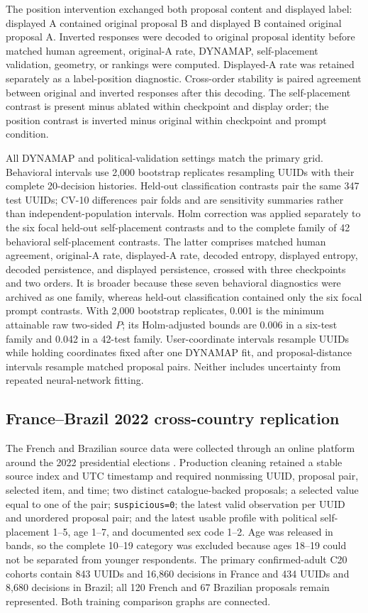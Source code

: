 \documentclass[unnumsec,webpdf,modern,large]{oup-authoring-template}
\begin{document}
The position intervention exchanged both proposal content and displayed label: displayed A contained original proposal B and displayed B contained original proposal A. Inverted responses were decoded to original proposal identity before matched human agreement, original-A rate, DYNAMAP, self-placement validation, geometry, or rankings were computed. Displayed-A rate was retained separately as a label-position diagnostic. Cross-order stability is paired agreement between original and inverted responses after this decoding. The self-placement contrast is present minus ablated within checkpoint and display order; the position contrast is inverted minus original within checkpoint and prompt condition.

All DYNAMAP and political-validation settings match the primary grid. Behavioral intervals use 2,000 bootstrap replicates resampling UUIDs with their complete 20-decision histories. Held-out classification contrasts pair the same 347 test UUIDs; CV-10 differences pair folds and are sensitivity summaries rather than independent-population intervals. Holm correction was applied separately to the six focal held-out self-placement contrasts and to the complete family of 42 behavioral self-placement contrasts. The latter comprises matched human agreement, original-A rate, displayed-A rate, decoded entropy, displayed entropy, decoded persistence, and displayed persistence, crossed with three checkpoints and two orders. It is broader because these seven behavioral diagnostics were archived as one family, whereas held-out classification contained only the six focal prompt contrasts. With 2,000 bootstrap replicates, 0.001 is the minimum attainable raw two-sided $P$; its Holm-adjusted bounds are 0.006 in a six-test family and 0.042 in a 42-test family. User-coordinate intervals resample UUIDs while holding coordinates fixed after one DYNAMAP fit, and proposal-distance intervals resample matched proposal pairs. Neither includes uncertainty from repeated neural-network fitting.

\subsection{France--Brazil 2022 cross-country replication}

The French and Brazilian source data were collected through an online platform around the 2022 presidential elections \citep{Navarrete2024}. Production cleaning retained a stable source index and UTC timestamp and required nonmissing UUID, proposal pair, selected item, and time; two distinct catalogue-backed proposals; a selected value equal to one of the pair; \texttt{suspicious=0}; the latest valid observation per UUID and unordered proposal pair; and the latest usable profile with political self-placement 1--5, age 1--7, and documented sex code 1--2. Age was released in bands, so the complete 10--19 category was excluded because ages 18--19 could not be separated from younger respondents. The primary confirmed-adult C20 cohorts contain 843 UUIDs and 16,860 decisions in France and 434 UUIDs and 8,680 decisions in Brazil; all 120 French and 67 Brazilian proposals remain represented. Both training comparison graphs are connected.
\end{document}
